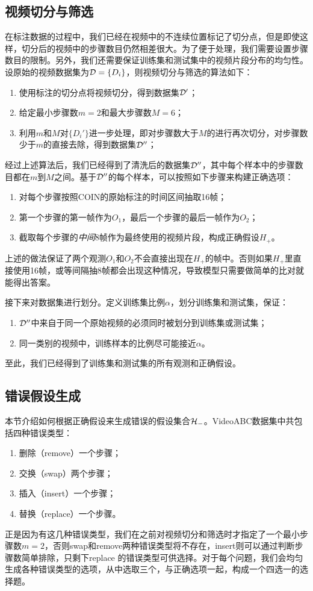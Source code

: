 \subsection{视频切分与筛选}
\label{sec:filter}
在标注数据的过程中，我们已经在视频中的不连续位置标记了切分点，但是即使这样，切分后的视频中的步骤数目仍然相差很大。为了便于处理，我们需要设置步骤数目的限制。另外，我们还需要保证训练集和测试集中的视频片段分布的均匀性。设原始的视频数据集为${\mathcal{D}}=\{D_i\}$，则视频切分与筛选的算法如下：
\begin{enumerate}
    \item 使用标注的切分点将视频切分，得到数据集${\mathcal{D}}'$；
    \item 给定最小步骤数$m=2$和最大步骤数$M=6$；
    \item 利用$m$和$M$对$\{D_i'\}$进一步处理，即对步骤数大于$M$的进行再次切分，对步骤数少于$m$的直接去除，得到数据集${\mathcal{D}}''$；

\end{enumerate}
经过上述算法后，我们已经得到了清洗后的数据集${\mathcal{D}}''$，其中每个样本中的步骤数目都在$m$到$M$之间。基于${\mathcal{D}}''$的每个样本，可以按照如下步骤来构建正确选项：
\begin{enumerate}
    \item 对每个步骤按照COIN的原始标注的时间区间抽取16帧；
    \item 第一个步骤的第一帧作为$O_1$，最后一个步骤的最后一帧作为$O_2$；
    \item 截取每个步骤的\emph{中间}8帧作为最终使用的视频片段，构成正确假设$H_+$。
\end{enumerate}

上述的做法保证了两个观测$O_1$和$O_2$不会直接出现在$H_+$的帧中。否则如果$H_+$里直接使用16帧，或等间隔抽8帧都会出现这种情况，导致模型只需要做简单的比对就能得出答案。

接下来对数据集进行划分。定义训练集比例$\alpha$，划分训练集和测试集，保证：
\begin{enumerate}
    \item ${\mathcal{D}}''$中来自于同一个原始视频的必须同时被划分到训练集或测试集；
    \item 同一类别的视频中，训练样本的比例尽可能接近$\alpha$。
\end{enumerate}
至此，我们已经得到了训练集和测试集的所有观测和正确假设。
\subsection{错误假设生成}
本节介绍如何根据正确假设来生成错误的假设集合${\mathcal{H}}_-$。VideoABC数据集中共包括四种错误类型：
\begin{enumerate}
    \item 删除（remove）一个步骤；
    \item 交换（swap）两个步骤；
    \item 插入（insert）一个步骤；
    \item 替换（replace）一个步骤。
\end{enumerate}
正是因为有这几种错误类型，我们在之前对视频切分和筛选时才指定了一个最小步骤数$m=2$，否则swap和remove两种错误类型将不存在，insert则可以通过判断步骤数简单排除，只剩下replace 的错误类型可供选择。对于每个问题，我们会均匀生成各种错误类型的选项，从中选取三个，与正确选项一起，构成一个四选一的选择题。
